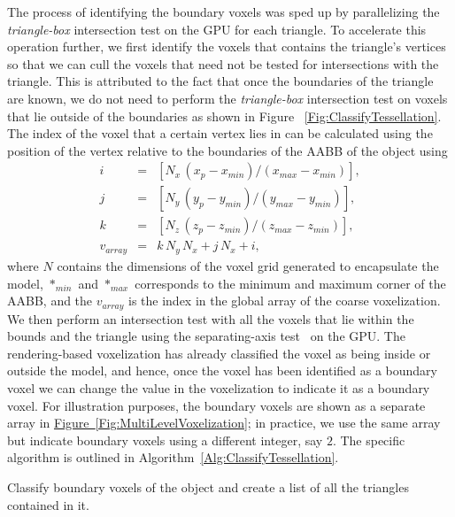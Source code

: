 \documentclass[10pt,letterpaper]{article}
\newcommand{\cref}[2]{\hyperref[#2]{#1~\ref*{#2}}}
\begin{document}
The process of identifying the boundary voxels was sped up by parallelizing the \emph{triangle-box} intersection test on the GPU for each triangle. To accelerate this operation further, we first identify the voxels that contains the triangle's vertices so that we can cull the voxels that need not be tested for intersections with the triangle. This is attributed to the fact that once the boundaries of the triangle are known, we do not need to perform the \emph{triangle-box} intersection test on voxels that lie outside of the boundaries as shown in Figure ~\ref{Fig:ClassifyTessellation}. The index of the voxel that a certain vertex lies in can be calculated using the position of the vertex relative to the boundaries of the AABB of the object using
\begin{eqnarray}
i &=& \left[N_x \, (x_{p} - x_{min}) / (x_{max} - x_{min}) \right],\\
j &=& \left[N_y \, (y_{p} - y_{min}) / (y_{max} - y_{min})\right],\\
k &=& \left[N_z \, (z_{p} - z_{min}) / (z_{max} - z_{min})\right],\\
v_{array} &=& k \, N_{y} \, N_{x} + j \, N_{x} + i,
\end{eqnarray}
\noindent where $N$ contains the dimensions of the voxel grid generated to encapsulate the model, $*_{min}$ and $*_{max}$ corresponds to the minimum and maximum corner of the AABB, and the $v_{array}$ is the index in the global array of the coarse voxelization. We then perform an intersection test with all the voxels that lie within the bounds and the triangle using the separating-axis test~\citep{gottschalk1996obbtree} on the GPU. The rendering-based voxelization has already classified the voxel as being inside or outside the model, and hence, once the voxel has been identified as a boundary voxel we can change the value in the voxelization to indicate it as a boundary voxel. For illustration purposes, the boundary voxels are shown as a separate array in \cref{Figure}{Fig:MultiLevelVoxelization}; in practice, we use the same array but indicate boundary voxels using a different integer, say $2$. The specific algorithm is outlined in Algorithm~\ref{Alg:ClassifyTessellation}.

\begin{algorithm}[h]
	\caption{Classify boundary voxels of the object and create a list of all the triangles contained in it.}
	\label{Alg:ClassifyTessellation}
\end{algorithm}
\end{document}
